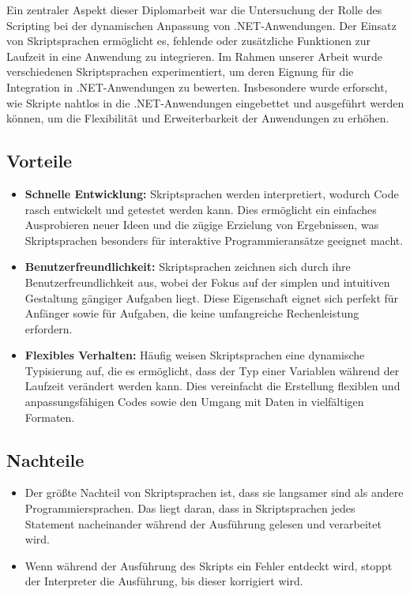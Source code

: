 Ein zentraler Aspekt dieser Diplomarbeit war die Untersuchung der Rolle des Scripting 
bei der dynamischen Anpassung von .NET-Anwendungen. Der Einsatz von Skriptsprachen ermöglicht es, 
fehlende oder zusätzliche Funktionen zur Laufzeit in eine Anwendung zu integrieren. 
Im Rahmen unserer Arbeit wurde verschiedenen Skriptsprachen experimentiert, um deren 
Eignung für die Integration in .NET-Anwendungen zu bewerten. Insbesondere wurde erforscht, 
wie Skripte nahtlos in die .NET-Anwendungen eingebettet und ausgeführt werden können, um die 
Flexibilität und Erweiterbarkeit der Anwendungen zu erhöhen. 

\newpage

\subsection*{Vorteile}

\begin{itemize}
    \item \textbf{Schnelle Entwicklung:} Skriptsprachen werden interpretiert, 
    wodurch Code rasch entwickelt und getestet werden kann. 
    Dies ermöglicht ein einfaches Ausprobieren neuer Ideen und die zügige 
    Erzielung von Ergebnissen, was Skriptsprachen besonders für interaktive 
    Programmieransätze geeignet macht.
    \item \textbf{Benutzerfreundlichkeit:} Skriptsprachen zeichnen sich durch ihre 
    Benutzerfreundlichkeit aus, wobei der Fokus auf der simplen und intuitiven 
    Gestaltung gängiger Aufgaben liegt. Diese Eigenschaft eignet sich perfekt für Anfänger 
    sowie für Aufgaben, die keine umfangreiche Rechenleistung erfordern.
    \item \textbf{Flexibles Verhalten:} Häufig weisen Skriptsprachen eine dynamische 
    Typisierung auf, die es ermöglicht, dass der Typ einer Variablen während der 
    Laufzeit verändert werden kann. Dies vereinfacht die Erstellung flexiblen und 
    anpassungsfähigen Codes sowie den Umgang mit Daten in vielfältigen Formaten.

\end{itemize}

\subsection*{Nachteile}

\begin{itemize}
    \item Der größte Nachteil von Skriptsprachen ist, dass sie langsamer sind als 
    andere Programmiersprachen. Das liegt daran, dass in Skriptsprachen jedes 
    Statement nacheinander während der Ausführung gelesen und verarbeitet wird.
    \item Wenn während der Ausführung des Skripts ein Fehler entdeckt wird, 
    stoppt der Interpreter die Ausführung, bis dieser korrigiert wird.
\end{itemize}

